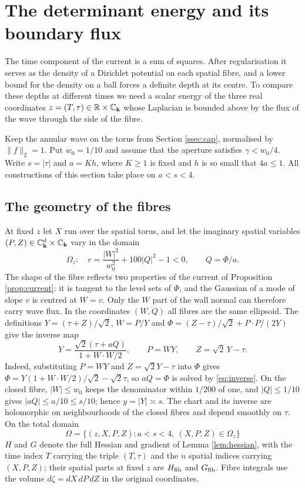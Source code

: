 \section{The determinant energy and its boundary flux}\label{sec:energy}

The time component of the current is a sum of squares. After regularisation it serves as the
density of a Dirichlet potential on each spatial fibre, and a lower bound for the density on a
ball forces a definite depth at its centre. To compare these depths at different times we need
a scalar energy of the three real coordinates $z=(T,\tau)\in\mathbb{R}\times\mathbb{C}_{\mathbf k}$ whose Laplacian is
bounded above by the flux of the wave through the side of the fibre.

Keep the annular wave on the torus from Section \ref{ssec:cap}, normalised by $\|f\|_2=1$. Put
$w_0=1/10$ and assume that the aperture satisfies $\gamma<w_0/4$. Write $s=|\tau|$ and $a=Kh$,
where $K\ge1$ is fixed and $h$ is so small that $4a\le1$. All constructions of this section take
place on $a<s<4$.

\subsection{The geometry of the fibres}\label{ssec:fibres}
At fixed $z$ let $X$ run over the spatial torus, and let the imaginary spatial variables
$(P,Z)\in\mathbb{C}_{\mathbf k}^d\times\mathbb{C}_{\mathbf k}$ vary in the domain
\begin{equation}\label{eq:fibre}
\Omega_z:\quad r=\frac{|W|^2}{w_0^2}+100|Q|^2-1<0,\qquad Q=\Phi/a .
\end{equation}
The shape of the fibre reflects two properties of the current of Proposition
\ref{prop:current}: it is tangent to the level sets of $\Phi$, and the Gaussian of a mode of
slope $v$ is centred at $W=v$. Only the $W$ part of the wall normal can therefore carry wave
flux. In the coordinates $(W,Q)$ all fibres are the same ellipsoid. The definitions
$Y=(\tau+Z)/\sqrt2$, $W=P/Y$ and $\Phi=(Z-\tau)/\sqrt2+P\cdot P/(2Y)$ give the inverse map
\begin{equation}\label{eq:inverse}
Y=\frac{\sqrt2(\tau+aQ)}{1+W\cdot W/2},\qquad P=WY,\qquad Z=\sqrt2\,Y-\tau .
\end{equation}
Indeed, substituting $P=WY$ and $Z=\sqrt2Y-\tau$ into $\Phi$ gives
$\Phi=Y(1+W\cdot W/2)/\sqrt2-\sqrt2\tau$, so $aQ=\Phi$ is solved by \eqref{eq:inverse}. On
the closed fibre, $|W|\le w_0$ keeps the denominator within $1/200$ of one, and $|Q|\le1/10$
gives $|aQ|\le a/10\le s/10$; hence $y=|Y|\asymp s$. The chart and its inverse are holomorphic
on neighbourhoods of the closed fibres and depend smoothly on $\tau$. On the total domain
\[
\Omega=\{(z,X,P,Z):a<s<4,\ (X,P,Z)\in\Omega_z\}
\]
$H$ and $G$ denote the full Hessian and gradient of Lemma \ref{lem:hessian}, with the time
index $T$ carrying the triple $(T,\tau)$ and the $n$ spatial indices carrying $(X,P,Z)$; their
spatial parts at fixed $z$ are $H_{\mathrm{fib}}$ and $G_{\mathrm{fib}}$. Fibre integrals use the volume
$d\zeta=dX\,dP\,dZ$ in the original coordinates.

